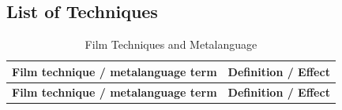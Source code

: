 \documentclass[a4paper]{article}
\begin{document}
\subsection{List of Techniques}
\renewcommand{\arraystretch}{1.3}
\begin{longtable}{|p{5cm}|p{\dimexpr\linewidth-5cm-2\tabcolsep-2\arrayrulewidth}|}
\caption{Film Techniques and Metalanguage} \label{tab:filmtechmeta} \\
\hline
\rowcolor[gray]{0.9} \textbf{Film technique / metalanguage term} & \textbf{Definition / Effect} \\
\hline
\endfirsthead

\hline
\rowcolor[gray]{0.9} \textbf{Film technique / metalanguage term} & \textbf{Definition / Effect} \\
\hline
\endhead


\end{longtable}
\end{document}
